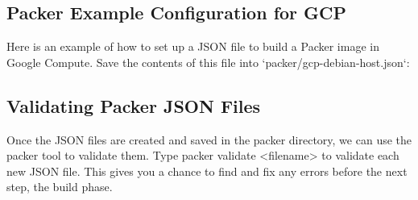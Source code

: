 \subsection{Packer Example Configuration for GCP}

\justify
Here is an example of how to set up a JSON file to build a Packer image
in Google Compute. Save the contents of this file into
`packer/gcp-debian-host.json`:

\begin{Shaded}
   \begin{Highlighting}[]
      \KeywordTok{\{}
      \NormalTok{:}\BuiltInTok{ [}
      \NormalTok{      \{}
      \NormalTok{: }\NormalTok{,}
      \NormalTok{: }\NormalTok{,}
      \NormalTok{: }\NormalTok{,}
      \NormalTok{: }\NormalTok{,}
      \NormalTok{: }\NormalTok{,}
      \NormalTok{: }\NormalTok{,}
      \NormalTok{: }\NormalTok{,}
      \NormalTok{: }\NormalTok{,}
      \NormalTok{: \{ }\NormalTok{: }\NormalTok{ \}}
      \NormalTok{      \}}
      \NormalTok{   ],}
      \NormalTok{: [}
      \NormalTok{      \{}
      \NormalTok{: }\NormalTok{,}
      \NormalTok{: [}
      \NormalTok{,}
      \NormalTok{,}
      \NormalTok{         ]}
      \NormalTok{      \}}
      \NormalTok{   ]}
      \NormalTok{\}}
   \end{Highlighting}
\end{Shaded}


\subsection{Validating Packer JSON Files}

\justify
Once the JSON files are created and saved in the packer directory, we
can use the packer tool to validate them. Type
packer validate \textless{}filename\textgreater{} to validate each new
JSON file. This gives you a chance to find and fix any errors before the
next step, the build phase.

